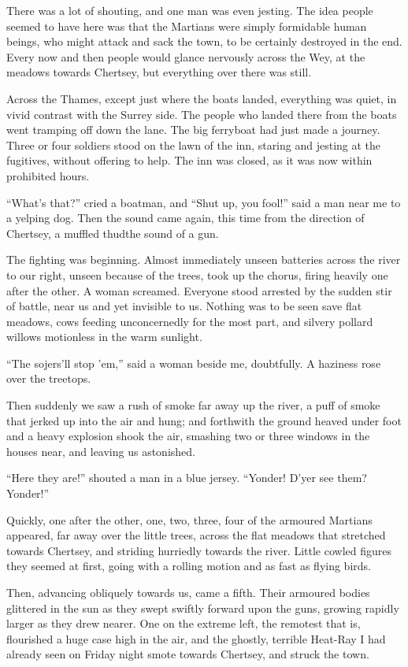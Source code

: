 There was a lot of shouting, and one man was even jesting. The idea
people seemed to have here was that the Martians were simply
formidable human beings, who might attack and sack the town, to be
certainly destroyed in the end. Every now and then people would
glance nervously across the Wey, at the meadows towards Chertsey,
but everything over there was still.

Across the Thames, except just where the boats landed, everything
was quiet, in vivid contrast with the Surrey side. The people who
landed there from the boats went tramping off down the lane. The
big ferryboat had just made a journey. Three or four soldiers stood
on the lawn of the inn, staring and jesting at the fugitives,
without offering to help. The inn was closed, as it was now within
prohibited hours.

``What's that?'' cried a boatman, and ``Shut up, you fool!'' said a man
near me to a yelping dog. Then the sound came again, this time from
the direction of Chertsey, a muffled thud\dash{}the sound of a gun.

The fighting was beginning. Almost immediately unseen batteries
across the river to our right, unseen because of the trees, took up
the chorus, firing heavily one after the other. A woman screamed.
Everyone stood arrested by the sudden stir of battle, near us and
yet invisible to us. Nothing was to be seen save flat meadows, cows
feeding unconcernedly for the most part, and silvery pollard
willows motionless in the warm sunlight.

``The sojers'll stop 'em,'' said a woman beside me, doubtfully. A
haziness rose over the treetops.

Then suddenly we saw a rush of smoke far away up the river, a puff
of smoke that jerked up into the air and hung; and forthwith the
ground heaved under foot and a heavy explosion shook the air,
smashing two or three windows in the houses near, and leaving us
astonished.

``Here they are!'' shouted a man in a blue jersey. ``Yonder! D'yer see
them? Yonder!''

Quickly, one after the other, one, two, three, four of the armoured
Martians appeared, far away over the little trees, across the flat
meadows that stretched towards Chertsey, and striding hurriedly
towards the river. Little cowled figures they seemed at first,
going with a rolling motion and as fast as flying birds.

Then, advancing obliquely towards us, came a fifth. Their armoured
bodies glittered in the sun as they swept swiftly forward upon the
guns, growing rapidly larger as they drew nearer. One on the
extreme left, the remotest that is, flourished a huge case high in
the air, and the ghostly, terrible Heat-Ray I had already seen on
Friday night smote towards Chertsey, and struck the town.

